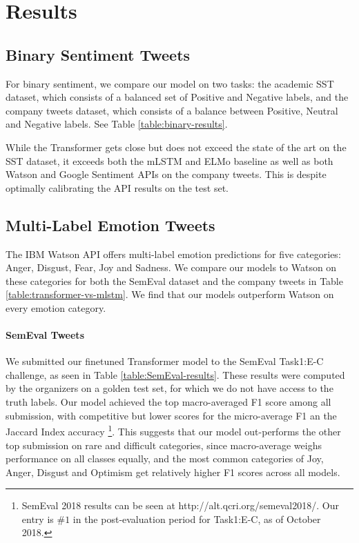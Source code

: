 \documentclass[letterpaper]{article} %
\begin{document}
\section{Results}
\subsection{Binary Sentiment Tweets}
For binary sentiment, we compare our model on two tasks: the academic SST dataset, which consists of a balanced set of Positive and Negative labels, and the company tweets dataset, which consists of a balance between Positive, Neutral and Negative labels. See Table \ref{table:binary-results}.

While the Transformer gets close but does not exceed the state of the art on the SST dataset, it exceeds both the mLSTM and ELMo baseline as well as both Watson and Google Sentiment APIs on the company tweets. This is despite optimally calibrating the API results on the test set.


\subsection{Multi-Label Emotion Tweets}
The IBM Watson API offers multi-label emotion predictions for five categories: Anger, Disgust, Fear, Joy and Sadness. We compare our models to Watson on these categories for both the SemEval dataset and the company tweets in Table \ref{table:transformer-vs-mlstm}. We find that our models outperform Watson on every emotion category.

\paragraph{SemEval Tweets}
We submitted our finetuned Transformer model to the SemEval Task1:E-C challenge, as seen in Table \ref{table:SemEval-results}. These results were computed by the organizers on a golden test set, for which we do not have access to the truth labels. Our model achieved the top macro-averaged F1 score among all submission, with competitive but lower scores for the micro-average F1 an the Jaccard Index accuracy \footnote{SemEval 2018 results can be seen at
http://alt.qcri.org/semeval2018/. Our entry is $\#1$ in the post-evaluation period for Task1:E-C, as of October 2018.}. This suggests that our model out-performs the other top submission on rare and difficult categories, since macro-average weighs performance on all classes equally, and the most common categories of Joy, Anger, Disgust and Optimism get relatively higher F1 scores across all models.
\end{document}
